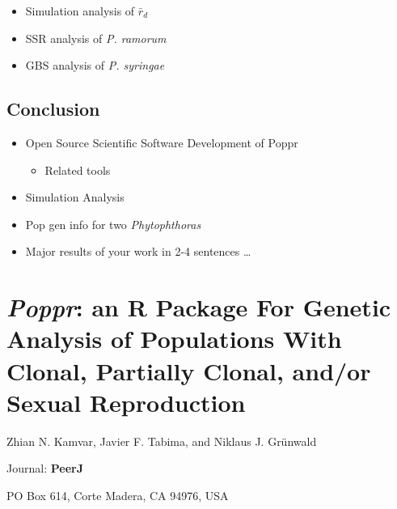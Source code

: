 \documentclass[double,12pt]{beavtex}
\providecommand{\tightlist}{%
  \setlength{\itemsep}{0pt}\setlength{\parskip}{0pt}}
\begin{document}
  \begin{itemize}
  \tightlist
  \item
    Simulation analysis of \(\bar{r}_d\)
  \item
    SSR analysis of \emph{P. ramorum}
  \item
    GBS analysis of \emph{P. syringae}
  \end{itemize}
  
  \section{Conclusion}\label{conclusion}
  
  \begin{itemize}
  \tightlist
  \item
    Open Source Scientific Software Development of Poppr
  
    \begin{itemize}
    \tightlist
    \item
      Related tools
    \end{itemize}
  \item
    Simulation Analysis
  \item
    Pop gen info for two \emph{Phytophthoras}
  \item
    Major results of your work in 2-4 sentences \ldots{}
  \end{itemize}
  
  \chapter{\texorpdfstring{\emph{Poppr}: an R Package For Genetic Analysis
  of Populations With Clonal, Partially Clonal, and/or Sexual
  Reproduction}{Poppr: an R Package For Genetic Analysis of Populations With Clonal, Partially Clonal, and/or Sexual Reproduction}}\label{poppr-an-r-package-for-genetic-analysis-of-populations-with-clonal-partially-clonal-andor-sexual-reproduction}
  
  \singlespacing
  
  \begin{center}
  
  Zhian N. Kamvar, Javier F. Tabima, and Niklaus J. Grünwald
  
  
  
  \end{center}\vspace*{\fill}
  
  Journal: \textbf{PeerJ}
  
  PO Box 614, Corte Madera, CA 94976, USA
  
\end{document}
